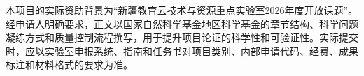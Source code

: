\justifying
\NSFCBodyText

本项目的实际资助背景为“新疆教育云技术与资源重点实验室2026年度开放课题”。经申请人明确要求，正文以国家自然科学基金地区科学基金的章节结构、科学问题凝练方式和质量控制流程撰写，用于提升项目论证的科学性和可验证性。实际提交时，应以实验室申报系统、指南和任务书对项目类别、内部申请代码、经费、成果标注和材料格式的要求为准。
